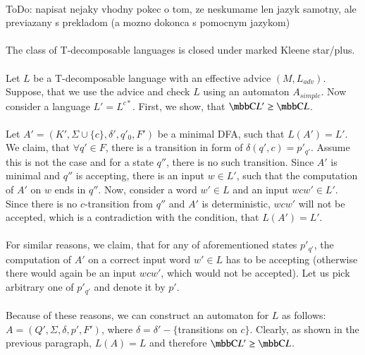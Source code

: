 \paragraph{}
\color{red}ToDo: napisat nejaky vhodny pokec o tom, ze neskumame len jazyk samotny, ale previazany s prekladom (a mozno dokonca s pomocnym jazykom)\color{black}

\paragraph{}
\cveta The class of T-decomposable languages is closed under marked Kleene star/plus.

\paragraph{}
\dokaz Let $L$ be a T-decomposable language with an effective advice $(M, L_{adv})$. Suppose, that we use the advice and check $L$ using an automaton $A_{simple}$. Now consider a language $L' = L^{c*}$. First, we show, that $\C{L'} \geq \C{L}$.

\paragraph{}
Let $A' = (K', \Sigma \cup \{c\}, \delta', q'_0, F')$ be a minimal DFA, such that $L(A') = L'$. We claim, that $\forall q' \in F$, there is a transition in form of $\delta(q', c) = p'_{q'}$. Assume this is not the case and for a state $q''$, there is no such transition. Since $A'$ is minimal and $q''$ is accepting, there is an input $w \in L'$, such that the computation of $A'$ on $w$ ends in $q''$. Now, consider a word $w' \in L$ and an input $wcw' \in L'$. Since there is no $c$-transition from $q''$ and $A'$ is deterministic, $wcw'$ will not be accepted, which is a contradiction with the condition, that $L(A') = L'$.

\paragraph{}
For similar reasons, we claim, that for any of aforementioned states $p'_{q'}$, the computation of $A'$ on a correct input word $w' \in L$ has to be accepting (otherwise there would again be an input $wcw'$, which would not be accepted). Let us pick arbitrary one of $p'_{q'}$ and denote it by $p'$.

\paragraph{}
Because of these reasons, we can construct an automaton for $L$ as follows: $A = (Q', \Sigma,\delta, \allowbreak p',  F')$, where $\delta = \delta' - \{$transitions on $c \}$. Clearly, as shown in the previous paragraph, $L(A) = L$ and therefore $\C{L'} \geq \C{L}$.

